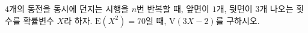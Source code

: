 $4$개의 동전을 동시에 던지는 시행을 $n$번 반복할 때, 앞면이 $1$개, 뒷면이 $3$개 나오는 횟수를 확률변수 $X$라 하자. $\mathrm{E}(X^2)=70$일 때, $\mathrm{V}(3X-2)$를 구하시오.
